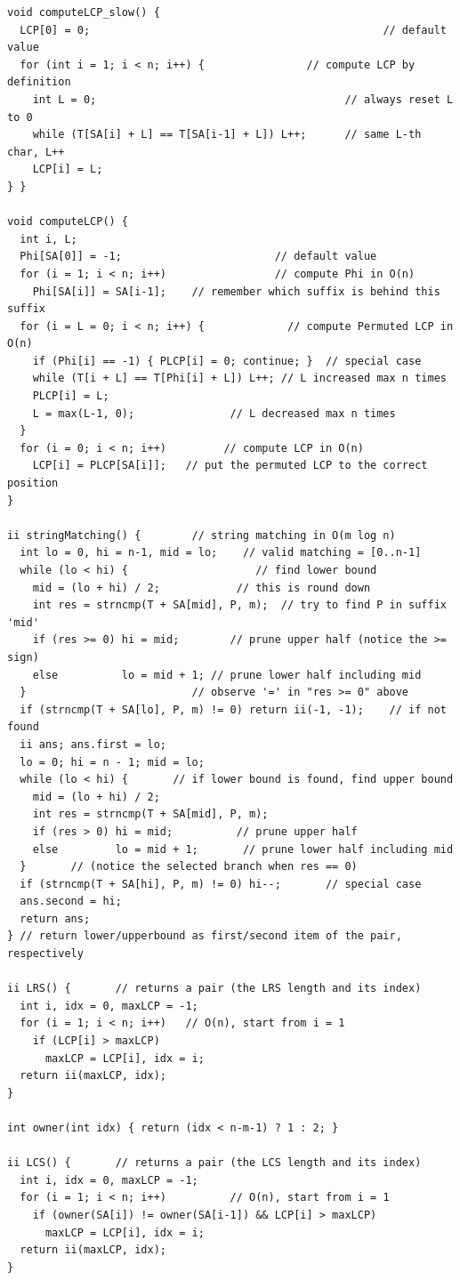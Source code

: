 \documentclass[10pt,landscape]{article}
\begin{document}
\begin{multicols}{2}
\begin{lstlisting}
void computeLCP_slow() {
  LCP[0] = 0;                                              // default value
  for (int i = 1; i < n; i++) {                // compute LCP by definition
    int L = 0;                                       // always reset L to 0
    while (T[SA[i] + L] == T[SA[i-1] + L]) L++;      // same L-th char, L++
    LCP[i] = L;
} }

void computeLCP() {
  int i, L;
  Phi[SA[0]] = -1;                        // default value
  for (i = 1; i < n; i++)                 // compute Phi in O(n)
    Phi[SA[i]] = SA[i-1];    // remember which suffix is behind this suffix
  for (i = L = 0; i < n; i++) {             // compute Permuted LCP in O(n)
    if (Phi[i] == -1) { PLCP[i] = 0; continue; }  // special case
    while (T[i + L] == T[Phi[i] + L]) L++; // L increased max n times
    PLCP[i] = L;
    L = max(L-1, 0);               // L decreased max n times
  }
  for (i = 0; i < n; i++)         // compute LCP in O(n)
    LCP[i] = PLCP[SA[i]];   // put the permuted LCP to the correct position
}

ii stringMatching() {        // string matching in O(m log n)
  int lo = 0, hi = n-1, mid = lo;    // valid matching = [0..n-1]
  while (lo < hi) {                    // find lower bound
    mid = (lo + hi) / 2;            // this is round down
    int res = strncmp(T + SA[mid], P, m);  // try to find P in suffix 'mid'
    if (res >= 0) hi = mid;        // prune upper half (notice the >= sign)
    else          lo = mid + 1; // prune lower half including mid
  }                          // observe '=' in "res >= 0" above
  if (strncmp(T + SA[lo], P, m) != 0) return ii(-1, -1);    // if not found
  ii ans; ans.first = lo;
  lo = 0; hi = n - 1; mid = lo;
  while (lo < hi) {       // if lower bound is found, find upper bound
    mid = (lo + hi) / 2;
    int res = strncmp(T + SA[mid], P, m);
    if (res > 0) hi = mid;          // prune upper half
    else         lo = mid + 1;       // prune lower half including mid
  }       // (notice the selected branch when res == 0)
  if (strncmp(T + SA[hi], P, m) != 0) hi--;       // special case
  ans.second = hi;
  return ans;
} // return lower/upperbound as first/second item of the pair, respectively

ii LRS() {       // returns a pair (the LRS length and its index)
  int i, idx = 0, maxLCP = -1;
  for (i = 1; i < n; i++)   // O(n), start from i = 1
    if (LCP[i] > maxLCP)
      maxLCP = LCP[i], idx = i;
  return ii(maxLCP, idx);
}

int owner(int idx) { return (idx < n-m-1) ? 1 : 2; }

ii LCS() {       // returns a pair (the LCS length and its index)
  int i, idx = 0, maxLCP = -1;
  for (i = 1; i < n; i++)          // O(n), start from i = 1
    if (owner(SA[i]) != owner(SA[i-1]) && LCP[i] > maxLCP)
      maxLCP = LCP[i], idx = i;
  return ii(maxLCP, idx);
}
\end{lstlisting}

\end{multicols}
\end{document}
